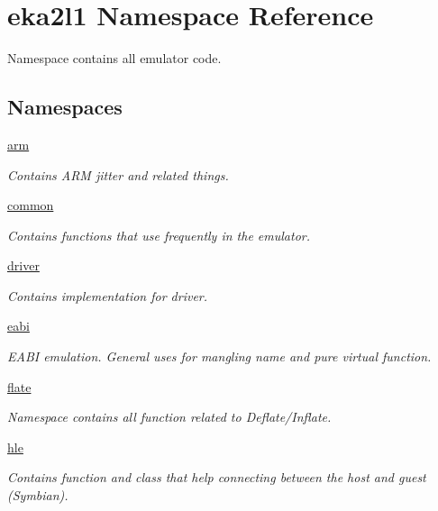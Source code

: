 \hypertarget{namespaceeka2l1}{}\section{eka2l1 Namespace Reference}
\label{namespaceeka2l1}


Namespace contains all emulator code.  


\subsection*{Namespaces}
\begin{DoxyCompactItemize}
\item 
 \mbox{\hyperlink{namespaceeka2l1_1_1arm}{arm}}
\begin{DoxyCompactList}\small\item\em Contains A\+RM jitter and related things. \end{DoxyCompactList}\item 
 \mbox{\hyperlink{namespaceeka2l1_1_1common}{common}}
\begin{DoxyCompactList}\small\item\em Contains functions that use frequently in the emulator. \end{DoxyCompactList}\item 
 \mbox{\hyperlink{namespaceeka2l1_1_1driver}{driver}}
\begin{DoxyCompactList}\small\item\em Contains implementation for driver. \end{DoxyCompactList}\item 
 \mbox{\hyperlink{namespaceeka2l1_1_1eabi}{eabi}}
\begin{DoxyCompactList}\small\item\em E\+A\+BI emulation. General uses for mangling name and pure virtual function. \end{DoxyCompactList}\item 
 \mbox{\hyperlink{namespaceeka2l1_1_1flate}{flate}}
\begin{DoxyCompactList}\small\item\em Namespace contains all function related to Deflate/\+Inflate. \end{DoxyCompactList}\item 
 \mbox{\hyperlink{namespaceeka2l1_1_1hle}{hle}}
\begin{DoxyCompactList}\small\item\em Contains function and class that help connecting between the host and guest (Symbian). \end{DoxyCompactList}\item 

\end{DoxyCompactItemize}
